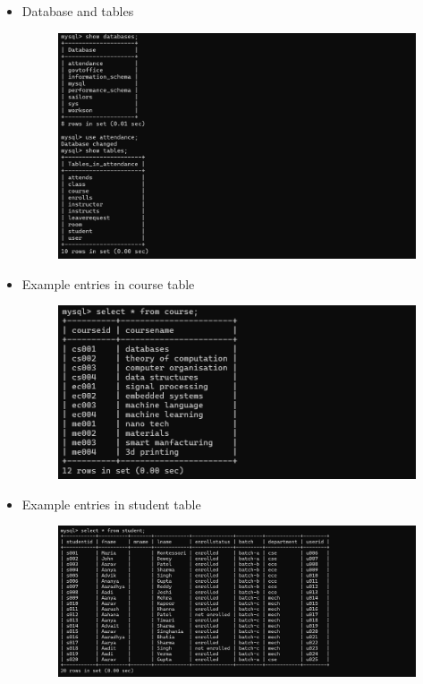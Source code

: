 \documentclass{article}
\begin{document}
\begin{itemize}
    \item \thispagestyle{empty}
    {\large{Database and tables}}
    \begin{figure}[H]
        \centering
        \includegraphics[width=1.1\textwidth, center]{1}
    \end{figure}

    \item \thispagestyle{empty}
    {\large{Example entries in course table}}
    \begin{figure}[H]
        \centering
        \includegraphics[width=1.1\textwidth, center]{2}
    \end{figure}

    \newpage

    \item \thispagestyle{empty}
    {\large{Example entries in student table}}
    \begin{figure}[H]
        \centering
        \includegraphics[width=1.1\textwidth, center]{3}
    \end{figure}


\end{itemize}
\end{document}
